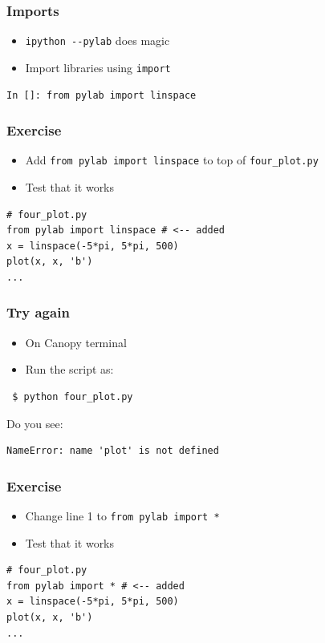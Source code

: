 \documentclass[14pt,compress]{beamer}
\newcounter{time}
\newcommand{\inctime}[1]{\addtocounter{time}{#1}{\tiny \thetime\ m}}
\newcommand{\typ}[1]{\lstinline{#1}}
\begin{document}
\begin{frame}[fragile]
  \frametitle{Imports}
  \begin{itemize}
  \item \typ{ipython --pylab} does magic
  \item Import libraries using \typ{import}
  \end{itemize}
\begin{lstlisting}
In []: from pylab import linspace
\end{lstlisting}
\end{frame}

\begin{frame}[fragile]
  \frametitle{Exercise}
  \begin{itemize}
  \item Add \typ{from pylab import linspace} to top of \typ{four_plot.py}
  \item Test that it works
  \end{itemize}
\begin{lstlisting}
# four_plot.py
from pylab import linspace # <-- added
x = linspace(-5*pi, 5*pi, 500)
plot(x, x, 'b')
...
\end{lstlisting}
\end{frame}

\begin{frame}[fragile]
  \frametitle{Try again}
  \begin{itemize}
  \item On Canopy terminal
  \item Run the script as:
  \end{itemize}
\begin{lstlisting}
 $ python four_plot.py
\end{lstlisting}
  \pause
  \vspace*{0.15in}
  Do you see:
  \begin{small}
\begin{lstlisting}
NameError: name 'plot' is not defined
\end{lstlisting}
  \end{small}
\end{frame}

\begin{frame}[fragile]
  \frametitle{Exercise}
  \begin{itemize}
  \item Change line 1 to \typ{from pylab import *}
  \item Test that it works
  \end{itemize}
\begin{lstlisting}
# four_plot.py
from pylab import * # <-- added
x = linspace(-5*pi, 5*pi, 500)
plot(x, x, 'b')
...
\end{lstlisting}
\inctime{5}
\end{frame}
\end{document}
